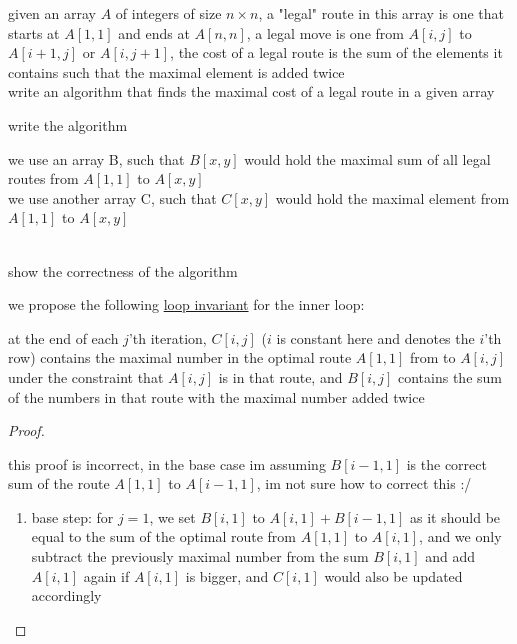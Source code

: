 \documentclass[a4paper,12pt]{article}
\begin{document}
\begin{question}
given an array \(A\) of integers of size \(n \times n\), a "legal" route in this array is one that starts at \(A[1,1]\) and ends at \(A[n,n]\), a legal move is one from \(A[i,j]\) to \(A[i+1,j]\) or \(A[i,j+1]\), the cost of a legal route is the sum of the elements it contains such that the maximal element is added twice\\
write an algorithm that finds the maximal cost of a legal route in a given array\\
\begin{subquestion}
write the algorithm\\
\begin{answer}
we use an array B, such that \(B[x,y]\) would hold the maximal sum of all legal routes from \(A[1,1]\) to \(A[x,y]\)\\
we use another array C, such that \(C[x,y]\) would hold the maximal element from \(A[1,1]\) to \(A[x,y]\)\\
\\
\end{answer}
\end{subquestion}
\begin{subquestion}
show the correctness of the algorithm\\
\begin{answer}
we propose the following \href{20221104221055-loop_invariant.org}{loop invariant} for the inner loop:\\
\begin{lemma}
at the end of each \(j\)'th iteration, \(C[i,j]\) (\(i\) is constant here and denotes the \(i\)'th row) contains the maximal number in the optimal route \(A[1,1]\) from to \(A[i,j]\) under the constraint that \(A[i,j]\) is in that route, and \(B[i,j]\) contains the sum of the numbers in that route with the maximal number added twice\\
\begin{proof}
\begin{note}
this proof is incorrect, in the base case im assuming \(B[i-1,1]\) is the correct sum of the route \(A[1,1]\) to \(A[i-1,1]\), im not sure how to correct this :/\\
\end{note}
\begin{enumerate}
\item base step: for \(j=1\), we set \(B[i,1]\) to \(A[i,1]+B[i-1,1]\) as it should be equal to the sum of the optimal route from \(A[1,1]\) to \(A[i,1]\), and we only subtract the previously maximal number from the sum \(B[i,1]\) and add \(A[i,1]\) again if \(A[i,1]\) is bigger, and \(C[i,1]\) would also be updated accordingly\\

\end{enumerate}
\end{proof}
\end{lemma}
\end{answer}
\end{subquestion}
\end{question}
\end{document}
